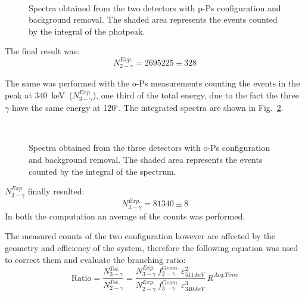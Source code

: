 \begin{figure}[H]
	\centering
	 \quad
		 \\
	\caption{Spectra obtained from the two detectors with p-Ps configuration and background removal. The shaded area represents the events counted by the integral of the photpeak. }
\label{Fig:1_2_integral}
\end{figure}

The final result was:
\begin{equation*}
N_{2-\gamma}^{Exp.}=2695225 \pm 328
\end{equation*}
 
The same was performed with the o-Ps measurements counting the events in the peak at 340~keV~($N_{3-\gamma}^{Exp.}$), one third of the total energy, due to the fact the three $\gamma$ have the same energy at 120$^\circ$. The integrated spectra are shown in Fig.~\ref{Fig:1_2_3_integral}. 

\begin{figure}[H]
	\centering
	 \quad
		 \quad
		 \\
	\caption{Spectra obtained from the three detectors with o-Ps configuration and background removal. The shaded area represents the events counted by the integral of the spectrum. }
\label{Fig:1_2_3_integral}
\end{figure}
$N_{3-\gamma}^{Exp.}$  finally resulted:
\begin{equation*}
N_{3-\gamma}^{Exp.}=81340\pm 8
\end{equation*}
 In both the computation an average of the counts was performed.
 
The measured counts of the two configuration however are affected by the geometry and efficiency of the system, therefore the following equation was used to correct them and evaluate the branching ratio:
\begin{equation*}
\text{Ratio}=\dfrac{N_{3-\gamma}^{Tot.}}{N_{2-\gamma}^{Tot.}}=\dfrac{N_{3-\gamma}^{Exp.}\ f_{2-\gamma}^{Geom.}\ \varepsilon_{511~keV}^2}{N_{2-\gamma}^{Exp.}\ f_{3-\gamma}^{Geom.}\ \varepsilon_{340~keV}^3}\ R^{Acq.Time}
\end{equation*}

